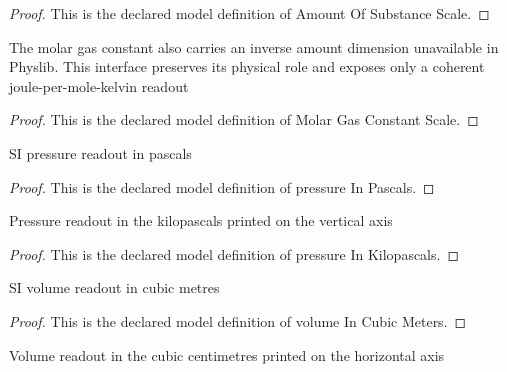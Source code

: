 \begin{proof}
  This is the declared model definition of Amount Of Substance Scale.
\end{proof}
\begin{definition}
  \label{def:physics:phyx-mini-0431:phyxminiproblems-problemphyxmini0431-molargasconstantscale}
  The molar gas constant also carries an inverse amount dimension unavailable in Physlib. This interface preserves its physical role and exposes only a coherent joule-per-mole-kelvin readout
\end{definition}
\begin{proof}
  This is the declared model definition of Molar Gas Constant Scale.
\end{proof}
\begin{definition}
  \label{def:physics:phyx-mini-0431:phyxminiproblems-problemphyxmini0431-pressureinpascals}
  SI pressure readout in pascals
\end{definition}
\begin{proof}
  This is the declared model definition of pressure In Pascals.
\end{proof}
\begin{definition}
  \label{def:physics:phyx-mini-0431:phyxminiproblems-problemphyxmini0431-pressureinkilopascals}
  Pressure readout in the kilopascals printed on the vertical axis
\end{definition}
\begin{proof}
  This is the declared model definition of pressure In Kilopascals.
\end{proof}
\begin{definition}
  \label{def:physics:phyx-mini-0431:phyxminiproblems-problemphyxmini0431-volumeincubicmeters}
  SI volume readout in cubic metres
\end{definition}
\begin{proof}
  This is the declared model definition of volume In Cubic Meters.
\end{proof}
\begin{definition}
  \label{def:physics:phyx-mini-0431:phyxminiproblems-problemphyxmini0431-volumeincubiccentimeters}
  Volume readout in the cubic centimetres printed on the horizontal axis
\end{definition}
